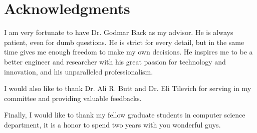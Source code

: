 \chapter{Acknowledgments}

I am very fortunate to have Dr. Godmar Back as my advisor. He is always patient,
even for dumb questions. 
He is strict for every detail, but in the same time gives me enough freedom
to make my own decisions.
He inspires me to be a better engineer and researcher with his great passion for
technology and innovation, and his unparalleled professionalism. 


I would also like to thank Dr. Ali R. Butt and  Dr. Eli Tilevich for serving in my
committee and providing valuable feedbacks.

Finally, I would like to thank my fellow graduate students in computer science department,
it is a honor to spend two years with you wonderful guys. 